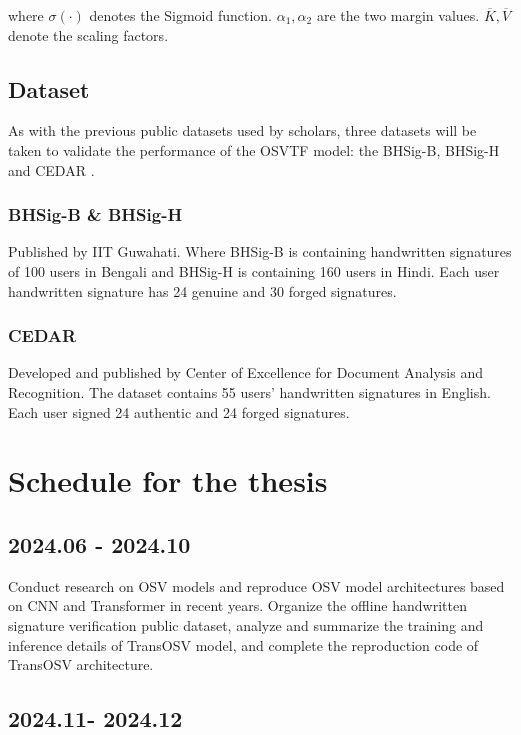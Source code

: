 \documentclass{article}
\begin{document}
where $\sigma(\cdot)$ denotes the Sigmoid function. $\alpha_1, \alpha_2$ are the two margin values. $\overline{K}, \overline{V}$ denote the scaling factors.

\subsection{Dataset}

As with the previous public datasets used by scholars, three datasets will be taken to validate the performance of the OSVTF model: the BHSig-B, BHSig-H \cite{21} and CEDAR \cite{22}.

\subsubsection*{BHSig-B \& BHSig-H}

Published by IIT Guwahati. Where BHSig-B is containing handwritten signatures of 100 users in Bengali and BHSig-H is containing 160 users in Hindi. Each user handwritten signature has 24 genuine and 30 forged signatures.

\subsubsection*{CEDAR}

Developed and published by Center of Excellence for Document Analysis and Recognition. The dataset contains 55 users' handwritten signatures in English. Each user signed 24 authentic and 24 forged signatures.

\newpage
\section{Schedule for the thesis}

\subsection*{2024.06 - 2024.10}

Conduct research on OSV models and reproduce OSV model architectures based on CNN and Transformer in recent years. Organize the offline handwritten signature verification public dataset, analyze and summarize the training and inference details of TransOSV model, and complete the reproduction code of TransOSV architecture.

\subsection*{2024.11- 2024.12}
\end{document}
